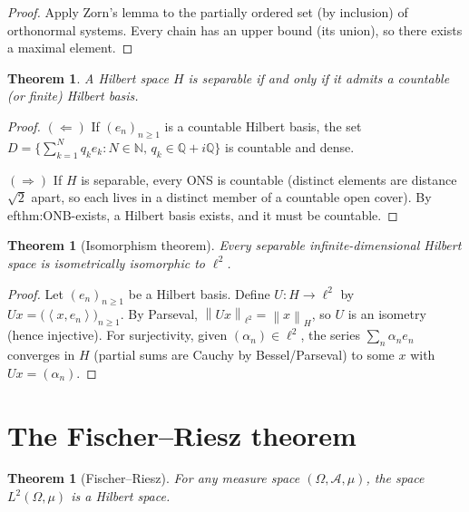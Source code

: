 \documentclass[a4paper,12pt]{book}
\newcommand{\N}{\mathbb{N}}
\newcommand{\Q}{\mathbb{Q}}
\newcommand{\norm}[1]{\left\| #1 \right\|}
\newcommand{\inner}[2]{\left\langle #1, #2 \right\rangle}
\theoremstyle{definition}
\theoremstyle{plain}
\newtheorem{theorem}[definition]{Theorem}
\theoremstyle{remark}
\begin{document}
\begin{proof}
Apply Zorn's lemma to the partially ordered set
(by inclusion) of orthonormal systems.  Every chain has an upper bound
(its union), so there exists a maximal element.
\end{proof}

\begin{theorem}
\label{thm:separable-countable-basis}
A Hilbert space $H$ is separable if and only if it admits a countable
(or finite) Hilbert basis.
\end{theorem}

\begin{proof}
$(\Leftarrow)$  If $(e_n)_{n\ge 1}$ is a countable Hilbert basis, the
set $D=\bigl\{\sum_{k=1}^N q_k e_k : N\in\N,\, q_k\in\Q+i\Q\bigr\}$
is countable and dense.

$(\Rightarrow)$  If $H$ is separable, every ONS is countable (distinct
elements are distance $\sqrt{2}$ apart, so each lives in a distinct
member of a countable open cover).  By 
ef{thm:ONB-exists}, a Hilbert
basis exists, and it must be countable.
\end{proof}

\begin{theorem}[Isomorphism theorem]
\label{thm:hilbert-isomorphism}
Every separable infinite-dimensional Hilbert space is isometrically
isomorphic to $\ell^2$.
\end{theorem}

\begin{proof}
Let $(e_n)_{n\ge 1}$ be a Hilbert basis.  Define
$U:H\to\ell^2$ by $Ux=\bigl(\inner{x}{e_n}\bigr)_{n\ge 1}$.
By Parseval, $\norm{Ux}_{\ell^2}=\norm{x}_H$, so $U$ is an isometry
(hence injective).  For surjectivity, given
$(\alpha_n)\in\ell^2$, the series $\sum_n\alpha_n e_n$ converges in $H$
(partial sums are Cauchy by Bessel/Parseval) to some $x$ with $Ux=(\alpha_n)$.
\end{proof}

\section{The Fischer--Riesz theorem}
\label{sec:fischer-riesz}

\begin{theorem}[{Fischer--Riesz}]
\label{thm:fischer-riesz}
For any measure space $(\Omega,\mathcal{A},\mu)$, the space
$L^2(\Omega,\mu)$ is a Hilbert space.
\end{theorem}
\end{document}
